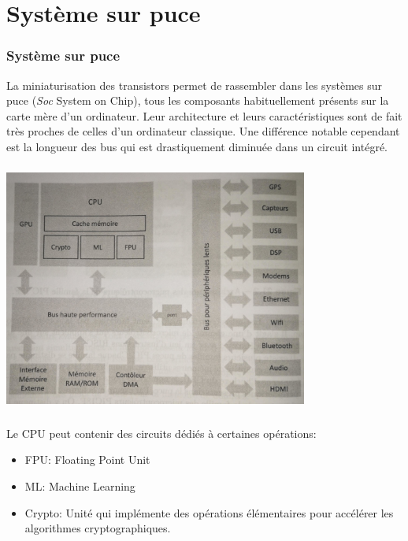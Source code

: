 \documentclass[svgnames,11pt]{beamer}
\begin{document}
\section{Système sur puce}
\begin{frame}
    \frametitle{Système sur puce}

    \begin{aretenir}[]
        La miniaturisation des transistors permet de rassembler dans les systèmes sur puce (\emph{Soc} System on Chip), tous les composants habituellement présents sur la carte mère d'un ordinateur. Leur architecture et leurs caractéristiques sont de fait très proches de celles d'un ordinateur classique. Une différence notable cependant est la longueur des bus qui est drastiquement diminuée dans un circuit intégré.
    \end{aretenir}
\end{frame}
\begin{frame}
    \frametitle{}

    \begin{center}
    \centering
    \includegraphics[width=10cm]{ressources/soc.jpg}
    \label{IMG}
    \end{center}

\end{frame}
\begin{frame}
    \frametitle{}

    Le CPU peut contenir des circuits dédiés à certaines opérations:
    \begin{itemize}
        
        \item FPU: Floating Point Unit
        \item ML: Machine Learning
        \item Crypto: Unité qui implémente des opérations élémentaires pour accélérer les algorithmes cryptographiques.
    \end{itemize}
\end{frame}
\end{document}
